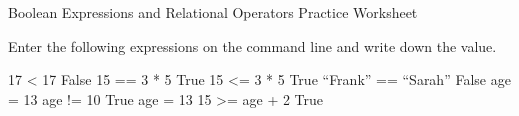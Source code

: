 Boolean Expressions and Relational Operators Practice Worksheet

Enter the following expressions on the command line and write down the value.


17 < 17
	False
15 == 3 * 5
	True
15 <= 3 * 5
	True
“Frank” == “Sarah”
	False
age = 13
age != 10	
  True
age = 13
15 >= age + 2	
  True
